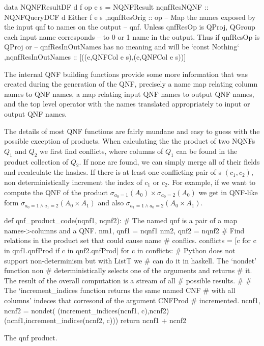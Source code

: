 \begin{code}
  \begin{haskellcode}
    data NQNFResultDF d f op e s =
    NQNFResult
    { nqnfResNQNF :: NQNFQueryDCF d Either f e s
      ,nqnfResOrig :: op
      -- Map the names exposed by the input qnf to names on the output
      -- qnf. Unless qnfResOp is QProj, QGroup each input name corresponds
      -- to 0 or 1 name in the output. Thus if qnfResOp is QProj or
      -- qnfResInOutNames has no meaning and will be `const Nothing`
      ,nqnfResInOutNames :: [((e,QNFCol e s),(e,QNFCol e s))]
    }
  \end{haskellcode}
  \caption{\label{lst:qnf_result}The internal QNF building functions
    provide some more information that was created during the
    generation of the QNF, precisely a name map relating column names
    to QNF names, a map relating input QNF names to output QNF names,
    and the top level operator with the names translated appropriately
    to input or output QNF names.}
\end{code}

The details of most QNF functions are fairly mundane and easy to guess
with the possible exception of products. When calculating the
the product of two NQNFs \(Q_1\) and \(Q_2\) we first find conflicts,
where columns of \(Q_1\) can be found in the product collection of
\(Q_2\). If none are found, we can simply merge all of their fields and recalculate the hashes.
If there is at least one conflicting pair of s \((c_1,c_2)\), non deterministically
increment the index of \(c_1\) or \(c_2\). For example, if we want to compute the QNF of the product
\(\sigma_{a_0=1}(A_0) \times \sigma_{a_0=2}(A_0)\) we get in QNF-like
form \(\sigma_{a_0=1 \land a_1=2} (A_0 \times A_1)\) and also
\(\sigma_{a_1=1 \land a_0=2} (A_0 \times A_1)\).

\begin{code}
  \begin{pycode}
    def qnf_product_code(nqnf1, nqnf2):
        # The named qnf is a pair of a map names->columns and a QNF.
        nm1, qnf1 = nqnf1
        nm2, qnf2 = nqnf2
        # Find relations in the product set that could cause name
        # conflics.
        conflicts = [c for c in qnf1.qnfProd if c in qnf2.qnfProd]
        for c in conflicts:
            # Python does not support non-determinism but with ListT we
            # can do it in haskell. The `nondet' function non
            # deterministically selects one of the arguments and returns
            # it. The result of the overall computation is a stream of all
            # possible results.
            #
            # The `increment_indices function returns the same named CNF
            # with all columns' indeces that corresond of the argument CNFProd
            # incremented.
            ncnf1, ncnf2 = nondet(
                (increment_indices(ncnf1, c),ncnf2)
                (ncnf1,increment_indicse(ncnf2, c)))
        return ncnf1 + ncnf2
\end{pycode}
  \caption{\label{lst:qnf_product}The qnf product.}
\end{code}

